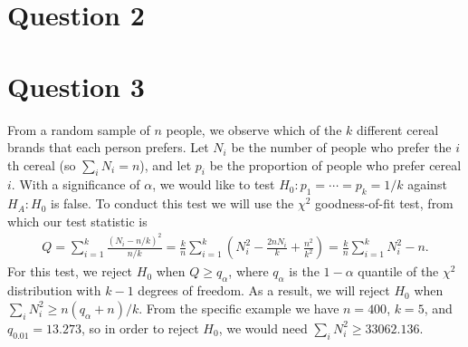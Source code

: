 \documentclass[10pt]{article}
\begin{document}
\section{Question 2} \noindent


\section{Question 3} \noindent
From a random sample of \(n\) people, we observe which of the \(k\) different cereal brands that each person prefers. Let \(N_i\) be the number of people who
prefer the \(i\)th cereal (so \(\sum_i N_i = n\)), and let \(p_i\) be the proportion of people who prefer cereal \(i\). With a significance of \(\alpha\), 
we would like to test 
\(H_0: p_1 = \cdots = p_k = 1/k\) against \(H_A:H_0\) is false. To conduct this test we will use the \(\chi^2\) goodness-of-fit test, 
from which our test statistic is 
\begin{align*}
    Q 
    = \sum_{i = 1}^k \frac{(N_i - n / k)^2}{n / k}
    = \frac{k}{n} \sum_{i=1}^k \left( N_i^2 - \frac{2 n N_i}{k} + \frac{n^2}{k^2} \right)
    = \frac{k}{n} \sum_{i=1}^k N_i^2 - n.
\end{align*}
For this test, we reject \(H_0\) when \(Q \ge q_{\alpha}\), where \(q_{\alpha}\) is the \(1 - \alpha\) quantile of the \(\chi^2\) distribution with \(k - 1\)
degrees of freedom. As a result, we will reject \(H_0\) when \(\sum_i N_i^2 \ge n(q_{\alpha} + n)/k\).
From the specific example we have \(n = 400\), \(k = 5\), and \(q_{0.01} = 13.273\), so in order to reject \(H_0\), we would need 
\(\sum_i N_i^2 \ge 33062.136\).

\end{document}
